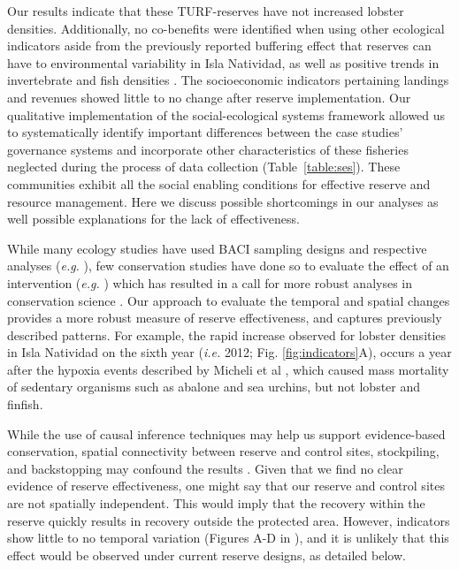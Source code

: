 \documentclass[10pt,letterpaper]{article}
\begin{document}
Our results indicate that these TURF-reserves have not increased lobster densities. Additionally, no co-benefits were identified when using other ecological indicators aside from the previously reported buffering effect that reserves can have to environmental variability in Isla Natividad, as well as positive trends in invertebrate and fish densities \cite{micheli_2012-EU,Villasenor-Derbez_2018}. The socioeconomic indicators pertaining landings and revenues showed little to no change after reserve implementation. Our qualitative implementation of the social-ecological systems framework allowed us to systematically identify important differences between the case studies’ governance systems and incorporate other characteristics of these fisheries neglected during the process of data collection (Table~\ref{table:ses}). These communities exhibit all the social enabling conditions for effective reserve and resource management. Here we discuss possible shortcomings in our analyses as well possible explanations for the lack of effectiveness.

While many ecology studies have used BACI sampling designs and respective analyses (\emph{e.g.} \cite{stewartoaten_1986}), few conservation studies have done so to evaluate the effect of an intervention (\emph{e.g.} \cite{francinifilho_2008,lester_2009,moland_2013,kerr_2019}) which has resulted in a call for more robust analyses in conservation science \cite{guidetti_2002,ferraro_2006}. Our approach to evaluate the temporal and spatial changes provides a more robust measure of reserve effectiveness, and captures previously described patterns. For example, the rapid increase observed for lobster densities in Isla Natividad on the sixth year (\emph{i.e.} 2012; Fig. \ref{fig:indicators}A), occurs a year after the hypoxia events described by Micheli et al \cite{micheli_2012-EU}, which caused mass mortality of sedentary organisms such as abalone and sea urchins, but not lobster and finfish.

While the use of causal inference techniques may help us support evidence-based conservation, spatial connectivity between reserve and control sites, stockpiling, and backstopping may confound the results \cite{kerr_2019}. Given that we find no clear evidence of reserve effectiveness, one might say that our reserve and control sites are not spatially independent. This would imply that the recovery within the reserve quickly results in recovery outside the protected area. However, indicators show little to no temporal variation (Figures A-D in ), and it is unlikely that this effect would be observed under current reserve designs, as detailed below.
\end{document}
